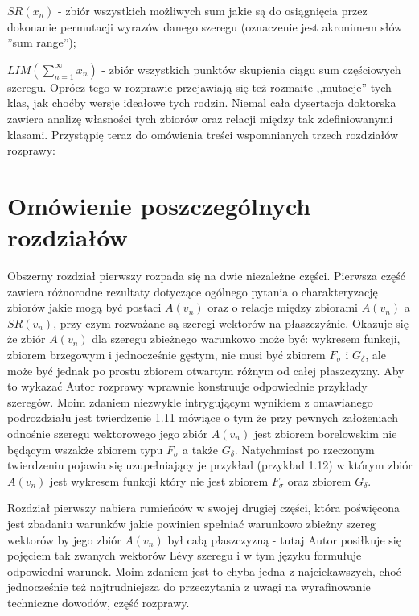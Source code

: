 \documentclass[12pt]{article}
\begin{document}
$SR(x_n)$ - zbiór wszystkich możliwych sum jakie są
do osiągnięcia przez dokonanie permutacji wyrazów
danego szeregu (oznaczenie jest akronimem słów 
''sum range'');

$LIM(\sum_{n=1}^\infty x_n)$ - zbiór wszystkich punktów
skupienia ciągu sum częściowych szeregu. Oprócz tego w rozprawie 
przejawiają się też rozmaite ,,mutacje''
tych klas, jak choćby wersje ideałowe tych rodzin. 
Niemal cała dysertacja doktorska zawiera analizę
własności tych zbiorów oraz relacji między tak zdefiniowanymi
klasami. Przystąpię teraz do omówienia treści wspomnianych trzech rozdziałów rozprawy:

\section{Omówienie poszczególnych rozdziałów}

  Obszerny rozdział pierwszy rozpada się na dwie niezależne części.
Pierwsza część zawiera różnorodne rezultaty dotyczące ogólnego
pytania o charakteryzację zbiorów jakie mogą być postaci $A(v_n)$
oraz o relacje między zbiorami $A(v_n)$ a $SR(v_n)$, przy czym
rozważane są szeregi wektorów na płaszczyźnie.
Okazuje się że zbiór $A(v_n)$ dla szeregu zbieżnego warunkowo 
może być: wykresem funkcji,
zbiorem brzegowym i jednocześnie gęstym, nie musi być zbiorem
$F_\sigma$ i $G_\delta$, ale może być jednak po prostu zbiorem
otwartym różnym od całej płaszczyzny. Aby to wykazać Autor rozprawy 
wprawnie konstruuje odpowiednie przykłady szeregów. Moim zdaniem niezwykle
intrygującym wynikiem z omawianego podrozdziału jest twierdzenie
1.11 mówiące o tym że przy pewnych założeniach odnośnie szeregu
wektorowego jego zbiór $A(v_n)$ jest zbiorem borelowskim 
nie będącym wszakże zbiorem typu $F_\sigma$ a także 
$G_\delta$. Natychmiast po rzeczonym twierdzeniu pojawia się uzupełniający
je przykład (przykład 1.12) w którym zbiór $A(v_n)$ jest wykresem funkcji 
który nie jest zbiorem $F_\sigma$ oraz zbiorem $G_\delta$. 

  Rozdział pierwszy nabiera rumieńców w swojej drugiej części, 
która poświęcona jest zbadaniu warunków jakie powinien spełniać
warunkowo zbieżny szereg wektorów by jego zbiór $A(v_n)$
był całą płaszczyzną - tutaj Autor posiłkuje się pojęciem tak 
zwanych wektorów L\'evy szeregu i w tym języku formułuje 
odpowiedni warunek. Moim zdaniem jest to chyba jedna z najciekawszych, 
choć jednocześnie też najtrudniejsza do przeczytania 
z uwagi na wyrafinowanie techniczne dowodów, część rozprawy.
  
\end{document}
